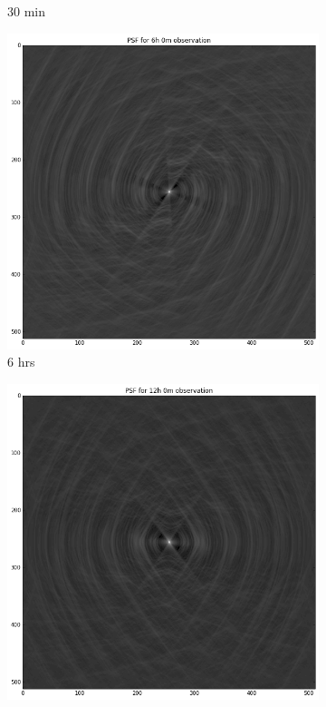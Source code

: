 \begin{figure}[h]
\begin{mdframed}
\begin{subfigure}[b]{0.24\textwidth}
  \caption{30 min}
 \end{subfigure}
 \begin{subfigure}[b]{0.24\textwidth}
  \includegraphics[width=\textwidth]{images/evla_observation_psf/6hr.png}
  \caption{6 hrs}
 \end{subfigure}
 \begin{subfigure}[b]{0.24\textwidth}
  \includegraphics[width=\textwidth]{images/evla_observation_psf/12hr.png}

\end{subfigure}
\end{mdframed}
\end{figure}
